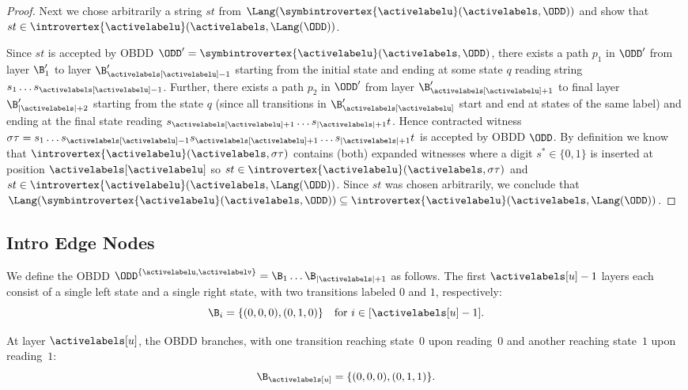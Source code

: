 \begin{proof}
Next we chose arbitrarily a string $st$ from $\Lang(\symbintrovertex{\activelabelu}(\activelabels,\ODD))$ and show that $st \in \introvertex{\activelabelu}(\activelabels,\Lang(\ODD))$.

Since $st$ is accepted by OBDD $\ODD' = \symbintrovertex{\activelabelu}(\activelabels,\ODD)$, there exists a path $p_1$ in $\ODD'$ from layer $\B'_1$ to layer $\B'_{\activelabels[\activelabelu]-1}$ starting from the initial state and ending at some state $q$ reading string $s_1\dots s_{\activelabels[\activelabelu]-1}$. Further, there exists a path $p_2$ in $\ODD'$ from layer $\B'_{\activelabels[\activelabelu]+1}$ to final layer $\B'_{|\activelabels| + 2}$ starting from the state $q$ (since all transitions in $\B'_{\activelabels[\activelabelu]}$ start and end at states of the same label) and ending at the final state reading $s_{\activelabels[\activelabelu] + 1} \dots s_{|\activelabels|+1}t$.
Hence contracted witness $\sigma\tau= s_1 \dots s_{\activelabels[\activelabelu] - 1}s_{\activelabels[\activelabelu] + 1} \dots s_{|\activelabels|+1}t$ is accepted by OBDD $\ODD$. By definition we know that $\introvertex{\activelabelu}(\activelabels, \sigma\tau)$ contains (both) expanded witnesses where a digit $s^* \in \{0,1\}$ is inserted at position $\activelabels[\activelabelu]$ so $st \in \introvertex{\activelabelu}(\activelabels, \sigma\tau)$ and $st \in \introvertex{\activelabelu}(\activelabels,\Lang(\ODD))$. Since $st$ was chosen arbitrarily, we conclude that $\Lang(\symbintrovertex{\activelabelu}(\activelabels,\ODD)) \subseteq \introvertex{\activelabelu}(\activelabels,\Lang(\ODD))$.
 

\end{proof}

\subsection{Intro Edge Nodes}

We define the OBDD $\ODD^{\{\activelabelu,\activelabelv\}}
= \B_1 \dots \B_{|\activelabels|+1}$ as follows.
The first $\activelabels[u]-1$ layers each consist of a single left state and a
single right state, with two transitions labeled $0$ and $1$, respectively:
\[
\B_i = \{(0,0,0),(0,1,0)\}
\quad\text{for } i \in [\activelabels[u]-1].
\]

At layer $\activelabels[u]$, the OBDD branches, with one transition reaching
state~$0$ upon reading~$0$ and another reaching state~$1$ upon reading~$1$:
\[
\B_{\activelabels[u]} = \{(0,0,0),(0,1,1)\}.
\]

